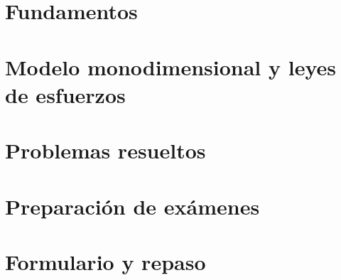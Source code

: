 \documentclass{aerobook}
\begin{document}
\hypersetup{pageanchor=false}



\hypersetup{pageanchor=true}

\frontmatter




\tableofcontents
\cleardoublepage
{}
\listoffigures
\cleardoublepage
{}
\listoftables
\cleardoublepage

\mainmatter
\part{Fundamentos}


\part{Modelo monodimensional y leyes de esfuerzos}


\part{Problemas resueltos}


\part{Preparación de exámenes}


\part{Formulario y repaso}


\appendix





\backmatter

\printindex
\end{document}
